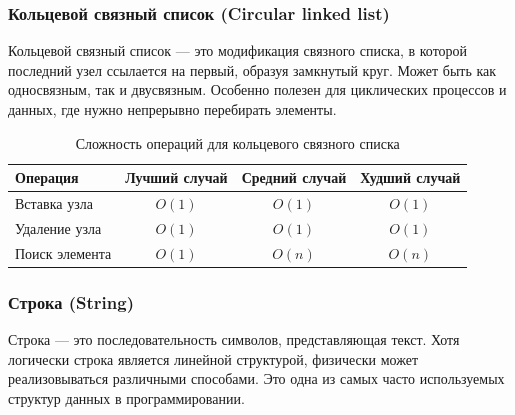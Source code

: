 \documentclass[a4paper,12pt]{article}
\begin{document}
\subsubsection{Кольцевой связный список (Circular linked list)}
\label{subsubsec:кольцевой-связный-список-circular-linked-list}

Кольцевой связный список --- это модификация связного списка, в которой последний узел ссылается на первый, образуя замкнутый круг. Может быть как односвязным, так и двусвязным. Особенно полезен для циклических процессов и данных, где нужно непрерывно перебирать элементы.

\begin{table}[H]
    \centering
    \begin{tabular}{|l|c|c|c|}
        \hline
        Операция & Лучший случай & Средний случай & Худший случай \\
        \hline
        Вставка узла & $O(1)$ & $O(1)$ & $O(1)$ \\
        \hline
        Удаление узла & $O(1)$ & $O(1)$ & $O(1)$ \\
        \hline
        Поиск элемента & $O(1)$ & $O(n)$ & $O(n)$ \\
        \hline
    \end{tabular}
    \caption{Сложность операций для кольцевого связного списка}
\end{table}

\subsubsection{Строка (String)}
\label{subsubsec:строка-string}

Строка --- это последовательность символов, представляющая текст. Хотя логически строка является линейной структурой, физически может реализовываться различными способами. Это одна из самых часто используемых структур данных в программировании.
\end{document}
